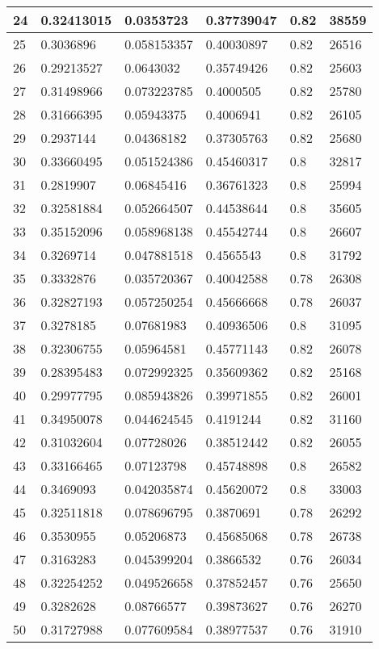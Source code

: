 \begin{longtable}{|l|l|l|l|l|l|}
24 & 0.32413015 & 0.0353723 & 0.37739047 & 0.82 & 38559 \\ \hline 
25 & 0.3036896 & 0.058153357 & 0.40030897 & 0.82 & 26516 \\ \hline 
26 & 0.29213527 & 0.0643032 & 0.35749426 & 0.82 & 25603 \\ \hline 
27 & 0.31498966 & 0.073223785 & 0.4000505 & 0.82 & 25780 \\ \hline 
28 & 0.31666395 & 0.05943375 & 0.4006941 & 0.82 & 26105 \\ \hline 
29 & 0.2937144 & 0.04368182 & 0.37305763 & 0.82 & 25680 \\ \hline 
30 & 0.33660495 & 0.051524386 & 0.45460317 & 0.8 & 32817 \\ \hline 
31 & 0.2819907 & 0.06845416 & 0.36761323 & 0.8 & 25994 \\ \hline 
32 & 0.32581884 & 0.052664507 & 0.44538644 & 0.8 & 35605 \\ \hline 
33 & 0.35152096 & 0.058968138 & 0.45542744 & 0.8 & 26607 \\ \hline 
34 & 0.3269714 & 0.047881518 & 0.4565543 & 0.8 & 31792 \\ \hline 
35 & 0.3332876 & 0.035720367 & 0.40042588 & 0.78 & 26308 \\ \hline 
36 & 0.32827193 & 0.057250254 & 0.45666668 & 0.78 & 26037 \\ \hline 
37 & 0.3278185 & 0.07681983 & 0.40936506 & 0.8 & 31095 \\ \hline 
38 & 0.32306755 & 0.05964581 & 0.45771143 & 0.82 & 26078 \\ \hline 
39 & 0.28395483 & 0.072992325 & 0.35609362 & 0.82 & 25168 \\ \hline 
40 & 0.29977795 & 0.085943826 & 0.39971855 & 0.82 & 26001 \\ \hline 
41 & 0.34950078 & 0.044624545 & 0.4191244 & 0.82 & 31160 \\ \hline 
42 & 0.31032604 & 0.07728026 & 0.38512442 & 0.82 & 26055 \\ \hline 
43 & 0.33166465 & 0.07123798 & 0.45748898 & 0.8 & 26582 \\ \hline 
44 & 0.3469093 & 0.042035874 & 0.45620072 & 0.8 & 33003 \\ \hline 
45 & 0.32511818 & 0.078696795 & 0.3870691 & 0.78 & 26292 \\ \hline 
46 & 0.3530955 & 0.05206873 & 0.45685068 & 0.78 & 26738 \\ \hline 
47 & 0.3163283 & 0.045399204 & 0.3866532 & 0.76 & 26034 \\ \hline 
48 & 0.32254252 & 0.049526658 & 0.37852457 & 0.76 & 25650 \\ \hline 
49 & 0.3282628 & 0.08766577 & 0.39873627 & 0.76 & 26270 \\ \hline 
50 & 0.31727988 & 0.077609584 & 0.38977537 & 0.76 & 31910 \\ \hline 
\end{longtable}